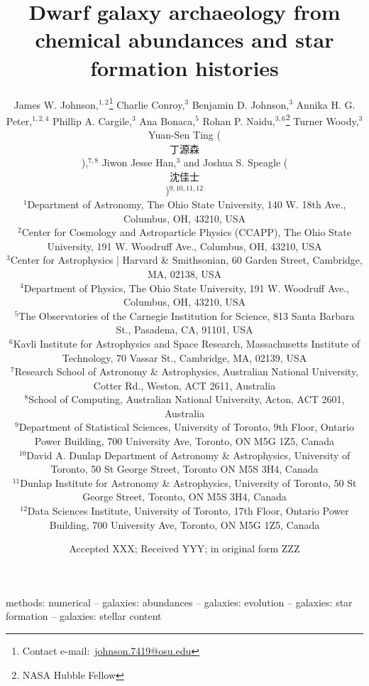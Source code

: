 \documentclass[fleqn, usenatbib]{mnras}
\title[Dwarf Galaxy Archaeology]{Dwarf galaxy archaeology from chemical
abundances and star formation histories}
\author[J.W. Johnson et al.]{James W. Johnson,$^{1, 2}$\thanks{
	Contact e-mail:~\href{mailto:johnson.7419@osu.edu}{johnson.7419@osu.edu}}
	Charlie Conroy,$^{3}$
	Benjamin D. Johnson,$^{3}$
	Annika H. G. Peter,$^{1, 2, 4}$
	\newauthor
	Phillip A. Cargile,$^{3}$
	Ana Bonaca,$^{5}$
	Rohan P. Naidu,$^{3, 6}$\thanks{NASA Hubble Fellow}
	Turner Woody,$^{3}$
	Yuan-Sen Ting
	(\begin{CJK*}{UTF8}{gbsn}丁源森\ignorespacesafterend\end{CJK*}),$^{7, 8}$
	\newauthor
	Jiwon Jesse Han,$^{3}$
	and Joshua S. Speagle
	(\begin{CJK*}{UTF8}{gbsn}沈佳士\ignorespacesafterend\end{CJK*})$^{9, 10, 11,
	12}$
	\\
	$^{1}$Department of Astronomy, The Ohio State University,
	140 W. 18th Ave., Columbus, OH, 43210, USA
	\\
	$^{2}$Center for Cosmology and Astroparticle Physics (CCAPP),
	The Ohio State University, 191 W. Woodruff Ave., Columbus, OH, 43210, USA
	\\
	$^{3}$Center for Astrophysics | Harvard \& Smithsonian, 60 Garden Street,
	Cambridge, MA, 02138, USA
	\\
	$^{4}$Department of Physics, The Ohio State University, 191 W. Woodruff
	Ave., Columbus, OH, 43210, USA
	\\
	$^{5}$The Observatories of the Carnegie Institution for Science, 813 Santa
	Barbara St., Pasadena, CA, 91101, USA
	\\
	$^{6}$Kavli Institute for Astrophysics and Space Research, Massachusetts
	Institute of Technology, 70 Vassar St., Cambridge, MA, 02139, USA
	\\
	$^{7}$Research School of Astronomy \& Astrophysics, Australian National
	University, Cotter Rd., Weston, ACT 2611, Australia
	\\
	$^{8}$School of Computing, Australian National University, Acton, ACT
	2601, Australia
	\\
	$^{9}$Department of Statistical Sciences, University of Toronto, 9th Floor,
	Ontario Power Building, 700 University Ave, Toronto, ON M5G 1Z5, Canada
	\\
	$^{10}$David A. Dunlap Department of Astronomy \& Astrophysics, University
	of Toronto, 50 St George Street, Toronto ON M5S 3H4, Canada
	\\
	$^{11}$Dunlap Institute for Astronomy \& Astrophysics, University of
	Toronto, 50 St George Street, Toronto, ON M5S 3H4, Canada
	\\
	$^{12}$Data Sciences Institute, University of Toronto, 17th Floor, Ontario
	Power Building, 700 University Ave, Toronto, ON M5G 1Z5, Canada
}
\date{Accepted XXX; Received YYY; in original form ZZZ}
\begin{document}
\label{firstpage}
\pagerange{\pageref{firstpage}--\pageref{lastpage}}
\maketitle



\begin{keywords}
methods: numerical -- galaxies: abundances -- galaxies: evolution --
galaxies: star formation -- galaxies: stellar content
\end{keywords}













\begin{appendices}


\end{appendices}

\label{lastpage}
\end{document}

